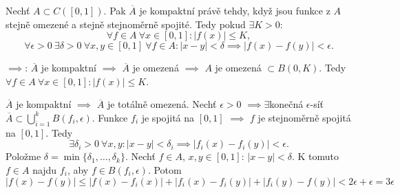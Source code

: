 \documentclass[12pt]{article}					%
\begin{document}
		\begin{veta}
			Nechť $A \subset C([0, 1])$. Pak $\overline{A}$ je kompaktní právě tehdy, když jsou funkce z $A$ stejně omezené a stejně stejnoměrně spojité. Tedy pokud $\exists K > 0$:
			$$ \forall f \in A\ \forall x \in [0, 1]: |f(x)| ≤ K, $$
			$$ \forall \epsilon > 0\ \exists \delta > 0\ \forall x, y \in [0, 1]\ \forall f \in A: |x - y| < \delta \implies |f(x) - f(y)| < \epsilon. $$

			\begin{dukazin}
				$\implies$: $\overline{A}$ je kompaktní $\implies$ $\overline{A}$ je omezená $\implies$ $A$ je omezená $\subset B(0, K)$. Tedy $\forall f \in A\ \forall x \in [0, 1]: |f(x)| ≤ K$.

				$\overline{A}$ je kompaktní $\implies$ $\overline{A}$ je totálně omezená. Nechť $\epsilon > 0$ $\implies \exists$konečná $\epsilon$-síť $\overline{A} \subset \bigcup_{i = 1}^k B(f_i, \epsilon)$. Funkce $f_i$ je spojitá na $[0, 1]$ $\implies$ $f$ je stejnoměrně spojitá na $[0, 1]$. Tedy
				$$ \exists \delta_i>0\ \forall x, y: |x - y| < \delta_i \implies |f_i(x) - f_i(y)| < \epsilon. $$
				Položme $\delta = \min\{\delta_1, …, \delta_k\}$. Nechť $f \in A$, $x, y \in [0, 1]$: $|x - y| < \delta$. K tomuto $f \in A$ najdu $f_i$, aby $f \in B(f_i, \epsilon)$. Potom
				$$ |f(x) - f(y)| ≤ |f(x) - f_i(x)| + |f_i(x) - f_i(y)| + |f_i(y) - f(y)| < 2\epsilon + \epsilon = 3\epsilon $$
			\end{dukazin}
		\end{veta}
\end{document}
